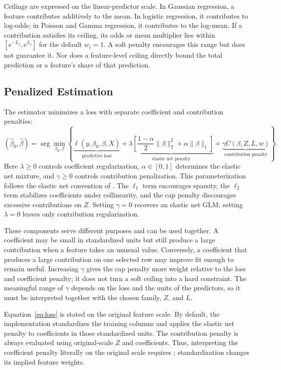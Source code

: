 \documentclass[article,shortnames,nofooter]{jss}
\begin{document}
Ceilings are expressed on the linear-predictor scale. In Gaussian regression, a feature contributes additively to the mean. In logistic regression, it contributes to log-odds; in Poisson and Gamma regression, it contributes to the log-mean. If a contribution satisfies its ceiling, its odds or mean multiplier lies within $[e^{-L_j},e^{L_j}]$ for the default $w_i=1$. A soft penalty encourages this range but does not guarantee it. Nor does a feature-level ceiling directly bound the total prediction or a feature's share of that prediction.

\subsection{Penalized Estimation}

The estimator minimizes a loss with separate coefficient and contribution penalties:
\begin{equation}
(\hat\beta_0,\hat\beta)=\arg\min_{\beta_0,\beta}
\left\{
\underbrace{\ell(y,\beta_0,\beta,X)}_{\text{predictive loss}}
+\underbrace{\lambda\!\left[\frac{1-\alpha}{2}\|\beta\|_2^2+\alpha\|\beta\|_1\right]}_{\text{elastic net penalty}}
+\underbrace{\gamma C(\beta,Z,L,w)}_{\text{contribution penalty}}
\right\}.
\label{eq:loss}
\end{equation}
Here $\lambda\geq0$ controls coefficient regularization, $\alpha\in[0,1]$ determines the elastic net mixture, and $\gamma\geq0$ controls contribution penalization. This parameterization follows the elastic net convention of \citet{friedman2010}. The $\ell_1$ term encourages sparsity, the $\ell_2$ term stabilizes coefficients under collinearity, and the cap penalty discourages excessive contributions on $Z$. Setting $\gamma=0$ recovers an elastic net GLM; setting $\lambda=0$ leaves only contribution regularization.

These components serve different purposes and can be used together. A coefficient may be small in standardized units but still produce a large contribution when a feature takes an unusual value. Conversely, a coefficient that produces a large contribution on one selected row may improve fit enough to remain useful. Increasing $\gamma$ gives the cap penalty more weight relative to the loss and coefficient penalty; it does not turn a soft ceiling into a hard constraint. The meaningful range of $\gamma$ depends on the loss and the units of the predictors, so it must be interpreted together with the chosen family, $Z$, and $L$.

Equation~\ref{eq:loss} is stated on the original feature scale. By default, the implementation standardizes the training columns and applies the elastic net penalty to coefficients in those standardized units. The contribution penalty is always evaluated using original-scale $Z$ and coefficients. Thus, interpreting the coefficient penalty literally on the original scale requires ; standardization changes its implied feature weights.
\end{document}

